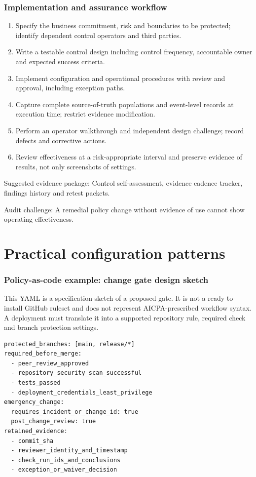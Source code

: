 \documentclass[10pt,oneside]{report}
\begin{document}
\subsection{Implementation and assurance workflow}
\begin{enumerate}
\item Specify the business commitment, risk and boundaries to be protected; identify dependent control operators and third parties.
\item Write a testable control design including control frequency, accountable owner and expected success criteria.
\item Implement configuration and operational procedures with review and approval, including exception paths.
\item Capture complete source-of-truth populations and event-level records at execution time; restrict evidence modification.
\item Perform an operator walkthrough and independent design challenge; record defects and corrective actions.
\item Review effectiveness at a risk-appropriate interval and preserve evidence of results, not only screenshots of settings.
\end{enumerate}

Suggested evidence package: Control self-assessment, evidence cadence tracker, findings history and retest packets.

Audit challenge: A remedial policy change without evidence of use cannot show operating effectiveness.

\chapter{Practical configuration patterns}
\subsection{Policy-as-code example: change gate design sketch}
This YAML is a specification sketch of a proposed gate. It is not a ready-to-install GitHub ruleset and does not represent AICPA-prescribed workflow syntax. A deployment must translate it into a supported repository rule, required check and branch protection settings.

\begin{lstlisting}[language={},caption={Illustrative release control intent, not GitHub configuration}]
protected_branches: [main, release/*]
required_before_merge:
  - peer_review_approved
  - repository_security_scan_successful
  - tests_passed
  - deployment_credentials_least_privilege
emergency_change:
  requires_incident_or_change_id: true
  post_change_review: true
retained_evidence:
  - commit_sha
  - reviewer_identity_and_timestamp
  - check_run_ids_and_conclusions
  - exception_or_waiver_decision
\end{lstlisting}
\end{document}
